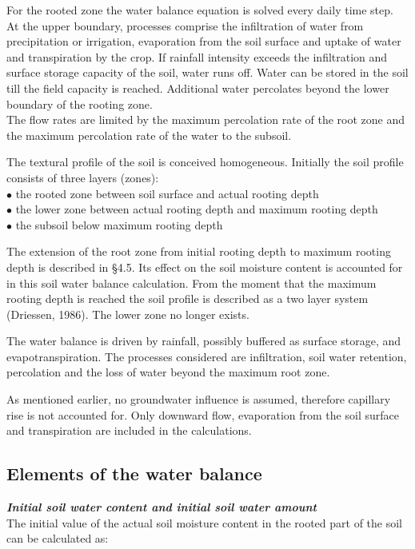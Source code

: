 For the rooted zone the water balance equation is solved every daily time step. At the
upper boundary, processes comprise the infiltration of water from precipitation or
irrigation, evaporation from the soil surface and uptake of water and transpiration by the
crop. If rainfall intensity exceeds the infiltration and surface storage capacity of the soil,
water runs off. Water can be stored in the soil till the field capacity is reached. Additional
water percolates beyond the lower boundary of the rooting zone.\\
The flow rates are limited by the maximum percolation rate of the root zone and the
maximum percolation rate of the water to the subsoil.

The textural profile of the soil is conceived homogeneous. Initially the soil profile
consists of three layers (zones):\\
$\bullet$ the rooted zone between soil surface and actual rooting depth\\
$\bullet$ the lower zone between actual rooting depth and maximum rooting depth\\
$\bullet$ the subsoil below maximum rooting depth

The extension of the root zone from initial rooting depth to maximum rooting depth is
described in \S 4.5. Its effect on the soil moisture content is accounted for in this soil water
balance calculation. From the moment that the maximum rooting depth is reached the soil
profile is described as a two layer system (Driessen, 1986). The lower zone no longer
exists.

The water balance is driven by rainfall, possibly buffered as surface storage, and
evapotranspi\-ration. The processes considered are infiltration, soil water retention,
percolation and the loss of water beyond the maximum root zone.

As mentioned earlier, no groundwater influence is assumed, therefore capillary rise is not
accounted for. Only downward flow, evaporation from the soil surface and transpiration
are included in the calcula\-tions. 

\newpage

\subsection{Elements of the water balance  }



{\it {\bf Initial soil water content and initial soil water amount}\/}\\
The initial value of the actual soil moisture content in the rooted part of the soil can be
calculated as:

